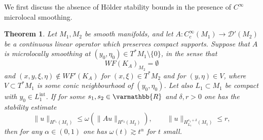\documentclass[12pt,twoside]{amsart}
\numberwithin{equation}{section}
\renewcommand{\leq}{\leqslant}
\renewcommand{\mathbb}{\varmathbb}
\newtheorem{theorem}{Theorem}[section]
\newcommand{\mR}{\mathbb{R}}                    %
\newcommand{\norm}[1]{\lVert #1 \rVert}         %
\begin{document}
We first discuss the absence of H{\"o}lder stability bounds in the presence of $C^{\infty}$ microlocal smoothing. 


\begin{theorem} \label{thm_microlocal_smoothing_general_v2}
Let $M_1, M_2$ be smooth manifolds, and let $A: C^{\infty}_c(M_1) \to \mathcal{D}'(M_2)$ be a continuous linear operator which preserves compact supports. Suppose that $A$ is microlocally smoothing at $(y_0,\eta_0) \in T^* M_1 \setminus \{0\}$, in the sense that $$WF(K_A)_{M_2} = \emptyset$$ and $(x,y,\xi,\eta) \notin WF'(K_A)$ for  $(x,\xi) \in T^* M_2$ and for $(y,\eta) \in V$, where $V \subset T^{\ast} M_1$ is some conic neighbourhood of $(y_0,\eta_0)$. Let also $L_1 \subset M_1$ be compact with $y_0 \in L_1^{\mathrm{int}}$. If for some $s_1, s_2 \in \mR$ and $\delta, r > 0$ one has the stability estimate 
\begin{equation} \label{microlocal_smoothing_holder_claim_1}
\norm{u}_{H^{s_1}(M_1)} \leq \omega(\norm{Au}_{H^{s_2}(M_2)}), \qquad \norm{u}_{H^{s_1+\delta}_{L_1}(M_1)} \leq r,
\end{equation}
then for any $\alpha \in (0,1)$ one has $\omega(t) \gtrsim t^{\alpha}$ for $t$ small.
\end{theorem}
\end{document}
